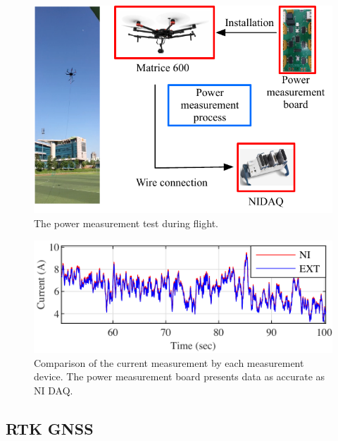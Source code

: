 \documentclass[journal]{./template/IEEEtran}
\begin{document}
\begin{figure}[ht]
\centering
\includegraphics[scale=0.82]{fig3/flight_experiment.pdf}
\caption{The power measurement test during flight.}
\label{fig:flight_test}
\end{figure}

\begin{figure}[ht]
\centering
\includegraphics[scale=1.0]{fig4/flight_exp_result.pdf}
\caption{Comparison of the current measurement by each measurement device. The power measurement board presents data as accurate as NI DAQ.}
\label{fig:flight_result}
\end{figure}

\label{Section: Design the power measurement board}





\subsection{RTK GNSS}
\end{document}
